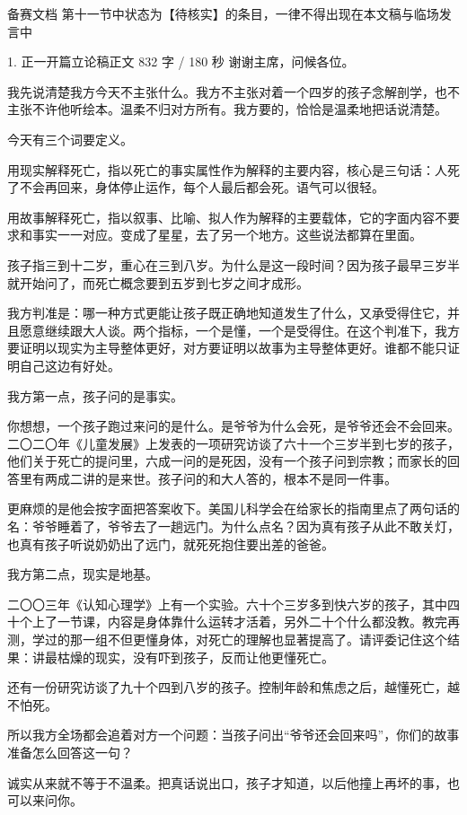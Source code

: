 \documentclass[script,pro]{debate}
\begin{document}
\debatetitle
\begin{contingency}备赛文档 第十一节中状态为【待核实】的条目，一律不得出现在本文稿与临场发言中\end{contingency}
\begin{speech}{1. 正一开篇立论稿}{正文 832 字 / 180 秒}
谢谢主席，问候各位。

我先说清楚我方今天不主张什么。我方不主张对着一个四岁的孩子念解剖学，也不主张不许他听绘本。温柔不归对方所有。我方要的，恰恰是温柔地把话说清楚。

今天有三个词要定义。

用现实解释死亡，指以死亡的事实属性作为解释的主要内容，核心是三句话：人死了不会再回来，身体停止运作，每个人最后都会死。语气可以很轻。

用故事解释死亡，指以叙事、比喻、拟人作为解释的主要载体，它的字面内容不要求和事实一一对应。变成了星星，去了另一个地方。这些说法都算在里面。

孩子指三到十二岁，重心在三到八岁。为什么是这一段时间？因为孩子最早三岁半就开始问了，而死亡概念要到五岁到七岁之间才成形。

我方判准是：哪一种方式更能让孩子既正确地知道发生了什么，又承受得住它，并且愿意继续跟大人谈。两个指标，一个是懂，一个是受得住。在这个判准下，我方要证明以现实为主导整体更好，对方要证明以故事为主导整体更好。谁都不能只证明自己这边有好处。

我方第一点，孩子问的是事实。

你想想，一个孩子跑过来问的是什么。是爷爷为什么会死，是爷爷还会不会回来。二〇二〇年《儿童发展》上发表的一项研究访谈了六十一个三岁半到七岁的孩子，他们关于死亡的提问里，六成一问的是死因，没有一个孩子问到宗教；而家长的回答里有两成二讲的是来世。孩子问的和大人答的，根本不是同一件事。

更麻烦的是他会按字面把答案收下。美国儿科学会在给家长的指南里点了两句话的名：爷爷睡着了，爷爷去了一趟远门。为什么点名？因为真有孩子从此不敢关灯，也真有孩子听说奶奶出了远门，就死死抱住要出差的爸爸。

我方第二点，现实是地基。

二〇〇三年《认知心理学》上有一个实验。六十个三岁多到快六岁的孩子，其中四十个上了一节课，内容是身体靠什么运转才活着，另外二十个什么都没教。教完再测，学过的那一组不但更懂身体，对死亡的理解也显著提高了。请评委记住这个结果：讲最枯燥的现实，没有吓到孩子，反而让他更懂死亡。

还有一份研究访谈了九十个四到八岁的孩子。控制年龄和焦虑之后，越懂死亡，越不怕死。

所以我方全场都会追着对方一个问题：当孩子问出“爷爷还会回来吗”，你们的故事准备怎么回答这一句？

诚实从来就不等于不温柔。把真话说出口，孩子才知道，以后他撞上再坏的事，也可以来问你。

\begin{contingency}
\end{contingency}
\end{speech}
\end{document}

